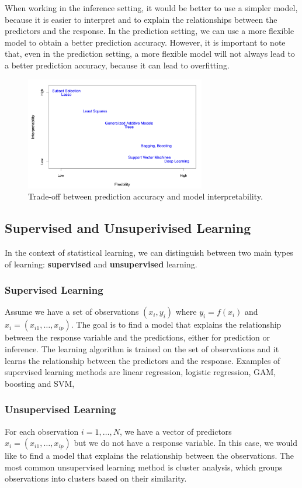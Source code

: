 When working in the inference setting, it would be better to use a simpler model, because it is easier to interpret and to explain the relationships between the predictors and the response. In the prediction setting, we can use a more flexible model to obtain a better prediction accuracy. However, it is important to note that, even in the prediction setting, a more flexible model will not always lead to a better prediction accuracy, because it can lead to overfitting.

\begin{figure}[H]
    \centering
    \includegraphics[width=0.7\textwidth]{./figures/intro/flexintertradeoff.png}
    \caption{Trade-off between prediction accuracy and model interpretability.}
    \label{fig:flexintertradeoff}
\end{figure}

\subsection*{Supervised and Unsuperivised Learning}
In the context of statistical learning, we can distinguish between two main types of learning: \textbf{supervised} and \textbf{unsupervised} learning.

\subsubsection*{Supervised Learning}
Assume we have a set of observations $(x_i, y_i)$ where $y_i = f(x_i)$ and $x_i = (x_{i1}, \dots, x_{ip})$. The goal is to find a model that explains the relationship between the response variable and the predictions, either for prediction or inference. The learning algorithm is trained on the set of observations and it learns the relationship between the predictors and the response. Examples of supervised learning methods are linear regression, logistic regression, GAM, boosting and SVM,

\subsubsection*{Unsupervised Learning}
For each observation $i=1,\dots,N$, we have a vector of predictors $x_i = (x_{i1}, \dots, x_{ip})$ but we do not have a response variable. In this case, we would like to find a model that explains the relationship between the observations. The most common unsupervised learning method is cluster analysis, which groups observations into clusters based on their similarity.

